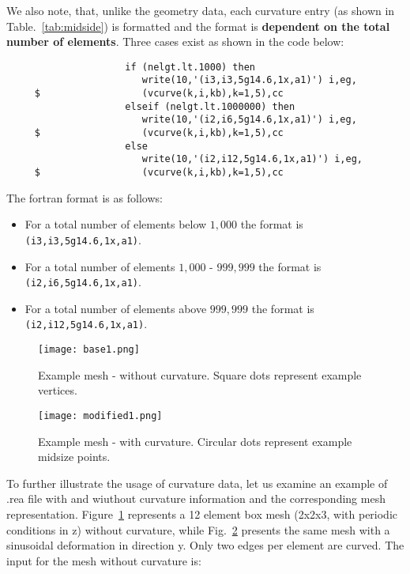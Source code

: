 \begin{description}
We also note, that, unlike the geometry data, each curvature entry (as shown in Table.~\ref{tab:midside}) is formatted and the format is {\bf dependent on the total number of elements}. Three cases exist as shown in the code below: 
\footnotesize
\begin{verbatim}
                     if (nelgt.lt.1000) then
                        write(10,'(i3,i3,5g14.6,1x,a1)') i,eg,
     $                  (vcurve(k,i,kb),k=1,5),cc
                     elseif (nelgt.lt.1000000) then
                        write(10,'(i2,i6,5g14.6,1x,a1)') i,eg,
     $                  (vcurve(k,i,kb),k=1,5),cc
                     else
                        write(10,'(i2,i12,5g14.6,1x,a1)') i,eg,
     $                  (vcurve(k,i,kb),k=1,5),cc
\end{verbatim}
\normalsize
The fortran format is as follows:
\begin{itemize}
\item For a total number of elements below $1,000$ the format is \texttt{(i3,i3,5g14.6,1x,a1)}.
\item For a total number of elements $1,000$ - $999,999$ the format is \texttt{(i2,i6,5g14.6,1x,a1)}.
\item For a total number of elements above $999,999$ the format is \texttt{(i2,i12,5g14.6,1x,a1)}.
\end{itemize}


\begin{figure}
\begin{center}
\texttt{[image: base1.png]}
\caption{Example mesh - without curvature. Square dots represent example vertices.}
\label{fig:ex1}
\end{center}
\end{figure}

\begin{figure}
\begin{center}
\texttt{[image: modified1.png]}
\caption{Example mesh -  with curvature. Circular dots represent example midsize points. }
\label{fig:ex2}
\end{center}
\end{figure}


To further illustrate the usage of curvature data, let us examine an example of .rea file with and wiuthout curvature information and the corresponding mesh representation. Figure~\ref{fig:ex1} represents a 12 element box mesh (2x2x3, with periodic conditions in z) without curvature, while Fig.~\ref{fig:ex2} presents the same mesh with a sinusoidal deformation in direction y. Only two edges per element are curved. 
The input for the mesh without curvature is:


\end{description}

